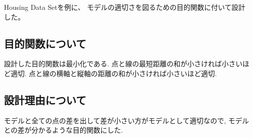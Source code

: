 Housing Data Set\cite{housingdata}を例に、
モデルの適切さを図るための目的関数に付いて設計した。

\subsection{目的関数について}
設計した目的関数は最小化である.
点と線の最短距離の和が小さければ小さいほど適切.
点と線の横軸と縦軸の距離の和が小さければ小さいほど適切. 
\subsection{設計理由について}
モデルと全ての点の差を出して差が小さい方がモデルとして適切なので,
モデルとの差が分かるような目的関数にした.